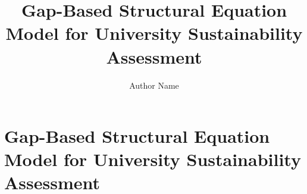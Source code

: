 \documentclass[11pt,a4paper]{article}
\begin{document}
\title{Gap-Based Structural Equation Model for University Sustainability Assessment}

\author{Author Name}

\date{}

\maketitle

\section{Gap-Based Structural Equation Model for University Sustainability Assessment}






\end{document}
